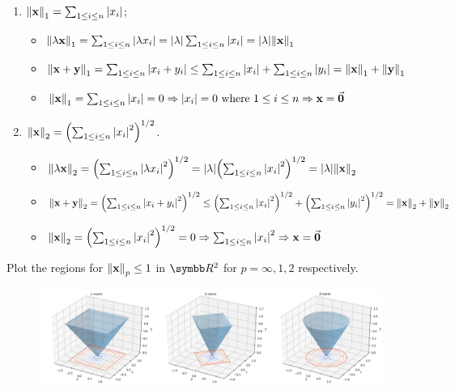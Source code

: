 \begin{enumerate}[label=(\alph*)]
\begin{enumerate}[label=\roman*.]
\begin{solution}{}{}
                \end{solution}
            \item $\norm{\vb{x}}_1=\sum_{1\leq i\leq n}\abs{x_i}$;
                \begin{solution}{}{}
                    \begin{itemize}
                        \item $\norm{\lambda\vb{x}}_1=\sum_{1\leq i\leq n}\abs{\lambda x_i}=\abs{\lambda}\sum_{1\leq i\leq n}\abs{x_i}=\abs{\lambda}\norm{\vb{x}}_1$
                        \item $\norm{\vb{x}+\vb{y}}_1=\sum_{1\leq i\leq n}\abs{x_i+y_i}\leq\sum_{1\leq i\leq n}\abs{x_i}+\sum_{1\leq i\leq n}\abs{y_i}=\norm{\vb{x}}_1+\norm{\vb{y}}_1$
                        \item $\norm{\vb{x}}_1=\sum_{1\leq i\leq n}\abs{x_i}=0\Rightarrow\abs{x_i}=0\text{ where $1\leq i\leq n$}\Rightarrow\vb{x} =\va{0}$
                    \end{itemize}
                \end{solution}
            \item $\norm{\vb{x}}_2=\qty(\sum_{1\leq i\leq n}\abs{x_i}^2)^{1/2}$.
                \begin{solution}{}{}
                    \begin{itemize}
                        \item $\norm{\lambda\vb{x}}_2=\qty(\sum_{1\leq i\leq n}\abs{\lambda x_i}^2)^{1/2}=\abs{\lambda}\qty(\sum_{1\leq i\leq n}\abs{x_i}^2)^{1/2}=\abs{\lambda}\norm{\vb{x}}_2$
                        \item $\norm{\vb{x}+\vb{y}}_2=\qty(\sum_{1\leq i\leq n}\abs{x_i+y_i}^2)^{1/2}\leq\qty(\sum_{1\leq i\leq n}\abs{x_i}^2)^{1/2}+\qty(\sum_{1\leq i\leq n}\abs{y_i}^2)^{1/2} = \norm{\vb{x}}_2+\norm{\vb{y}}_2$
                        \item $\norm{\vb{x}}_2=\qty(\sum_{1\leq i\leq n}\abs{x_i}^2)^{1/2}=0\Rightarrow\sum_{1\leq i\leq n}\abs{x_i}^2\Rightarrow\vb{x} =\va{0}$
                    \end{itemize}
                \end{solution}
        \end{enumerate}
        Plot the regions for $\norm{\vb{x}}_p\leq 1$ in $\RR^2$ for $p=\infty,1,2$ respectively.
        \begin{figure}[H]
            \centering
            \includegraphics[width=.9\textwidth]{figures/1-1}

\end{figure}
\end{enumerate}
